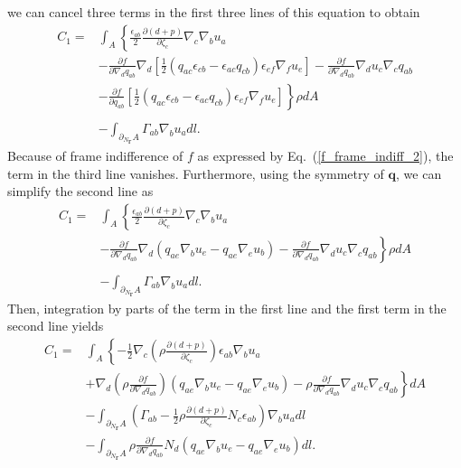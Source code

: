 \documentclass[12pt]{iopart}
\begin{document}
we can cancel three terms in the first three lines of this equation to obtain
\begin{eqnarray}
C_1 = &\int_A \left\{ \frac{\epsilon_{ab}}{2} \frac{\partial ( d+ p)}{\partial {\zeta}_c} \nabla_c \nabla_b {u}_a  \right. \nonumber \\  
& -  \frac{\partial f}{\partial \nabla_d q_{ab}} \nabla_d\left[  \frac{1}{2}\left({q}_{ac} {\epsilon}_{cb} -{\epsilon}_{ac}{q}_{cb} \right) {\epsilon}_{ef}\nabla_f{u}_e\right]  -  \frac{\partial f}{\partial \nabla_d q_{ab}} \nabla_d {u}_c\nabla_c{q}_{ab} \nonumber\\
&\left.  - \frac{\partial f}{\partial q_{ab}} \left[  \frac{1}{2}\left({q}_{ac} {\epsilon}_{cb} -{\epsilon}_{ac}{q}_{cb} \right) {\epsilon}_{ef}\nabla_f{u}_e\right] \right\}\rho dA \nonumber\\
\nonumber\\& -\int_{\partial_{N_{\bm{\Gamma}}} A} \Gamma_{ab} \nabla_b u_a dl.
\end{eqnarray}
Because of frame indifference of $f$ as expressed by Eq.~(\ref{f_frame_indiff_2}), the term in the third line vanishes. Furthermore, using the symmetry of $\bm{q}$, we can simplify the second line as
\begin{eqnarray}
C_1 = &\int_A \left\{ \frac{\epsilon_{ab}}{2} \frac{\partial ( d+ p)}{\partial {\zeta}_c} \nabla_c \nabla_b {u}_a  \right. \nonumber \\  
&\left.  -  \frac{\partial f}{\partial \nabla_d q_{ab}} \nabla_d \left(  {q}_{ae} \nabla_b {u}_e -  {q}_{ae} \nabla_e {u}_b\right)  -  \frac{\partial f}{\partial \nabla_d q_{ab}} \nabla_d {u}_c\nabla_c{q}_{ab} \right\}\rho dA \nonumber\\
\nonumber\\& -\int_{\partial_{N_{\bm{\Gamma}}} A} \Gamma_{ab} \nabla_b u_a dl.
\end{eqnarray}
 Then, integration by parts of the term in the first line and the first term in the second line yields
\begin{eqnarray}
C_1 = &\int_A \left\{-\frac{1}{2}\nabla_c\left(\rho  \frac{\partial ( d+ p)}{\partial {\zeta}_c}\right) \epsilon_{ab} \nabla_b {u}_a  \right. \nonumber \\  
& \left. +   \nabla_d\left( \rho\frac{\partial f}{\partial \nabla_d q_{ab}}\right) \left(  {q}_{ae} \nabla_b {u}_e -  {q}_{ae} \nabla_e {u}_b\right)  -  \rho\frac{\partial f}{\partial \nabla_d q_{ab}} \nabla_d {u}_c\nabla_c{q}_{ab} \right\} dA \nonumber\\
& -\int_{\partial_{N_{\bm{\Gamma}}} A} \left( \Gamma_{ab} -  \frac{1}{2} \rho  \frac{\partial ( d+ p)}{\partial {\zeta}_c} N_c \epsilon_{ab} \right)\nabla_b u_a dl \nonumber \\
& -\int_{\partial_{N_{\bm{\Gamma}}} A}   \rho\frac{\partial f}{\partial \nabla_d q_{ab}} N_d \left(  {q}_{ae} \nabla_b {u}_e -  {q}_{ae} \nabla_e {u}_b\right)  dl.
\end{eqnarray}
\end{document}
